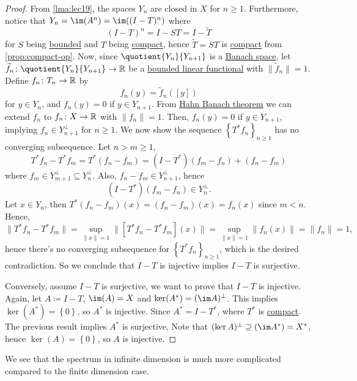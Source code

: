 \begin{proof}
	From \autoref{lma:lec19}, the spaces \(Y_n\) are closed in \(X\) for \(n\geq 1\). Furthermore, notice that \(Y_n = \im(A^n) = \im((I-T)^n)\) where
	\[
		(I-T)^n = I - ST = I - \widetilde{T}
	\]
	for \(S\) being \hyperref[def:bounded-map]{bounded} and \(T\) being \hyperref[def:compact-op]{compact}, hence \(\widetilde{T} = ST\)  is \hyperref[def:compact-op]{compact} from \autoref{prop:compact-op}. Now, since \(\quotient{Y_n}{Y_{n+1}} \) is a \hyperref[def:Banach-space]{Banach space}, let \(\widetilde{f} _n \colon \quotient{Y_n}{Y_{n+1}} \to  \mathbb{\MakeUppercase{r}} \) be a \hyperref[def:bounded-linear-functional]{bounded linear functional} with \(\lVert \widetilde{f} _n \rVert=1 \). Define \(f_{n} \colon T_n \to  \mathbb{\MakeUppercase{r}} \) by
	\[
		f_n (y) = \widetilde{f} _n([y])
	\]
	for \(y\in Y_n\), and \(f_n(y) = 0\)  if \(y\in Y_{n+1}\). From \hyperref[thm:Hahn-Banach]{Hahn Banach theorem} we can extend \(f_{n} \) to \(f_{n} \colon X\to \mathbb{\MakeUppercase{r}} \) with \(\lVert f_{n}  \rVert = 1\). Then, \(f_{n} (y) = 0\) if \(y\in Y_{n+1}\), implying \(f_{n} \in Y^{\perp} _{n+1}\) for \(n\geq 1\). We now show the sequence \(\left\{ T^{\ast} f_{n}  \right\} _{n\geq 1}\) has no converging subsequence. Let \(n > m \geq 1\),
	\[
		T^{\ast} f_{n} - T^{\ast} f_m= T^{\ast} (f_{n} - f_{m}) = (I-T^{\ast} )(f_m-f_{n})+ (f_{n} -f_{m})
	\]
	where \(f_m\in Y^{\perp} _{m+1} \subseteq Y^{\perp} _n\). Also, \(f_n - f_m\in Y^{\perp} _{n+1}\), hence
	\[
		(I-T^{\ast} )(f_m - f_n)\in Y^{\perp} _n.
	\]
	Let \(x\in Y_n\), then \(T^{\ast} (f_{n} - f_m)(x) = (f_n - f_m)(x)=f_n(x)\) since \(m < n\). Hence,
	\[
		\lVert T^{\ast} f_n - T^{\ast} f_m \rVert
		= \sup _{\lVert x \rVert = 1} \lVert [T^{\ast} f_n - T^{\ast} f_m] (x)\rVert
		= \sup _{\lVert x \rVert = 1} \lVert f_n(x) \rVert
		= \lVert f_n \rVert
		= 1,
	\]
	hence there's no converging subsequence for \(\left\{ T^{\ast} f_n \right\}_{n\geq 1} \), which is the desired contradiction. So we conclude that \(I-T\) is injective implies \(I-T\) is surjective.

	Conversely, assume \(I-T\) is surjective, we want to prove that \(I-T\) is injective. Again, let \(A\coloneqq I-T\), \(\im(A) = X\) and \(\ker(A^{\ast} )= (\im A)^{\perp} \). This implies \(\ker(A^{\ast} ) = \left\{ 0\right\} \), so \(A^{\ast} \) is injective. Since \(A^{\ast} = I-T^{\ast} \), where \(T^{\ast} \) is \hyperref[def:compact-op]{compact}. The previous result implies \(A^{\ast} \) is surjective, Note that \((\ker A)^{\perp} \supseteq (\im A^{\ast} )= X^{\ast}\), hence \(\ker(A) = \left\{ 0 \right\} \), so \(A\) is injective.
\end{proof}

We see that the spectrum in infinite dimension is much more complicated compared to the finite dimension case.